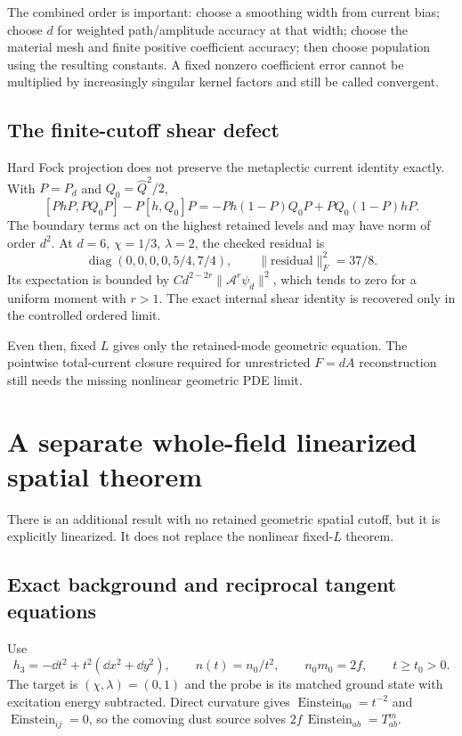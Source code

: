 \documentclass[11pt]{article}
\begin{document}
The combined order is important: choose a smoothing width from current bias; choose $d$ for weighted path/amplitude accuracy at that width; choose the material mesh and finite positive coefficient accuracy; then choose population using the resulting constants. A fixed nonzero coefficient error cannot be multiplied by increasingly singular kernel factors and still be called convergent.

\subsection{The finite-cutoff shear defect}
Hard Fock projection does not preserve the metaplectic current identity exactly. With $P=P_d$ and $Q_0=\widehat Q^2/2$,
\[
[PhP,PQ_0P]-P[h,Q_0]P
=-Ph(1-P)Q_0P+PQ_0(1-P)hP.
\]
The boundary terms act on the highest retained levels and may have norm of order $d^2$. At $d=6$, $\chi=1/3$, $\lambda=2$, the checked residual is
\[
\operatorname{diag}(0,0,0,0,5/4,7/4),
\qquad \|\mathrm{residual}\|_F^2=37/8.
\]
Its expectation is bounded by
$Cd^{2-2r}\|\mathcal A^r\psi_d\|^2$, which tends to zero for a uniform moment with $r>1$. The exact internal shear identity is recovered only in the controlled ordered limit.

Even then, fixed $L$ gives only the retained-mode geometric equation. The pointwise total-current closure required for unrestricted $F=dA$ reconstruction still needs the missing nonlinear geometric PDE limit.

\section{A separate whole-field linearized spatial theorem}
There is an additional result with no retained geometric spatial cutoff, but it is explicitly linearized. It does not replace the nonlinear fixed-$L$ theorem.

\subsection{Exact background and reciprocal tangent equations}
Use
\[
h_3=-\dd t^2+t^2(\dd x^2+\dd y^2),\qquad
n(t)=n_0/t^2,\qquad n_0m_0=2f,\qquad t\ge t_0>0.
\]
The target is $(\chi,\lambda)=(0,1)$ and the probe is its matched ground state with excitation energy subtracted. Direct curvature gives
$\operatorname{Einstein}_{00}=t^{-2}$ and
$\operatorname{Einstein}_{ij}=0$, so the comoving dust source solves
$2f\,\operatorname{Einstein}_{ab}=T^m_{ab}$.
\end{document}
